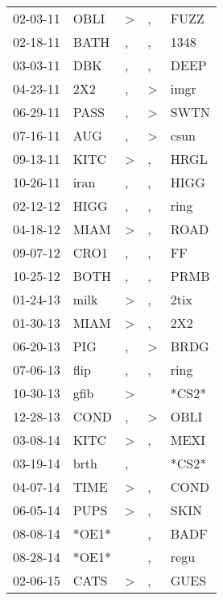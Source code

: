 \begin{supertabular}{lllll}
 02-03-11 &   OBLI &  \textgreater &                , &   FUZZ \\
 02-18-11 &   BATH &             , &                , &   1348 \\
 03-03-11 &    DBK &             , &                , &   DEEP \\
 04-23-11 &    2X2 &             , &     \textgreater &   imgr \\
 06-29-11 &   PASS &             , &     \textgreater &   SWTN \\
 07-16-11 &    AUG &             , &     \textgreater &   csun \\
 09-13-11 &   KITC &  \textgreater &                , &   HRGL \\
 10-26-11 &   iran &             , &                , &   HIGG \\
 02-12-12 &   HIGG &             , &                , &   ring \\
 04-18-12 &   MIAM &  \textgreater &                , &   ROAD \\
 09-07-12 &   CRO1 &             , &                , &     FF \\
 10-25-12 &   BOTH &             , &                , &   PRMB \\
 01-24-13 &   milk &  \textgreater &                , &   2tix \\
 01-30-13 &   MIAM &  \textgreater &                , &    2X2 \\
 06-20-13 &    PIG &             , &     \textgreater &   BRDG \\
 07-06-13 &   flip &             , &                , &   ring \\
 10-30-13 &   gfib &  \textgreater &                  &  *CS2* \\
 12-28-13 &   COND &             , &     \textgreater &   OBLI \\
 03-08-14 &   KITC &  \textgreater &                , &   MEXI \\
 03-19-14 &   brth &             , &                  &  *CS2* \\
 04-07-14 &   TIME &  \textgreater &                , &   COND \\
 06-05-14 &   PUPS &  \textgreater &                , &   SKIN \\
 08-08-14 &  *OE1* &               &                , &   BADF \\
 08-28-14 &  *OE1* &               &                , &   regu \\
 02-06-15 &   CATS &  \textgreater &                , &   GUES \\

\end{supertabular}
